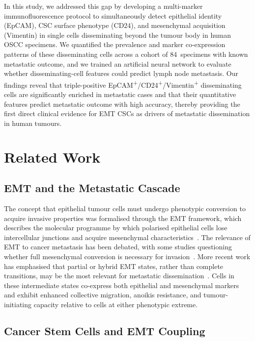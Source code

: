 \documentclass[11pt,a4paper]{article}
\begin{document}
In this study, we addressed this gap by developing a multi-marker immunofluorescence protocol to simultaneously detect epithelial identity (EpCAM), CSC surface phenotype (CD24), and mesenchymal acquisition (Vimentin) in single cells disseminating beyond the tumour body in human OSCC specimens. We quantified the prevalence and marker co-expression patterns of these disseminating cells across a cohort of 84~specimens with known metastatic outcome, and we trained an artificial neural network to evaluate whether disseminating-cell features could predict lymph node metastasis. Our findings reveal that triple-positive EpCAM\textsuperscript{+}/CD24\textsuperscript{+}/Vimentin\textsuperscript{+} disseminating cells are significantly enriched in metastatic cases and that their quantitative features predict metastatic outcome with high accuracy, thereby providing the first direct clinical evidence for EMT CSCs as drivers of metastatic dissemination in human tumours.

\section{Related Work}

\subsection{EMT and the Metastatic Cascade}

The concept that epithelial tumour cells must undergo phenotypic conversion to acquire invasive properties was formalised through the EMT framework, which describes the molecular programme by which polarised epithelial cells lose intercellular junctions and acquire mesenchymal characteristics~\cite{thiery2009}. The relevance of EMT to cancer metastasis has been debated, with some studies questioning whether full mesenchymal conversion is necessary for invasion~\cite{williams2019}. More recent work has emphasised that partial or hybrid EMT states, rather than complete transitions, may be the most relevant for metastatic dissemination~\cite{pastushenko2019,jolly2015}. Cells in these intermediate states co-express both epithelial and mesenchymal markers and exhibit enhanced collective migration, anoikis resistance, and tumour-initiating capacity relative to cells at either phenotypic extreme.

\subsection{Cancer Stem Cells and EMT Coupling}
\end{document}
